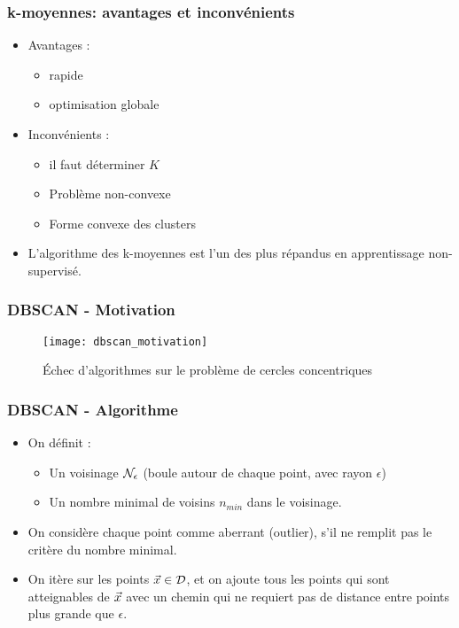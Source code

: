 \begin{frame}
\frametitle{k-moyennes: avantages et inconvénients}
  \begin{itemize}
  	\item Avantages : 
  	\begin{itemize}
  		\item rapide
  		\item optimisation globale
  	\end{itemize}
  	\item Inconvénients : 
  	\begin{itemize}
  		\item il faut déterminer $K$
  		\item Problème non-convexe
  		\item Forme convexe des clusters
  	\end{itemize}
  	\item L'algorithme des k-moyennes est l'un des plus répandus en apprentissage non-supervisé. 
  \end{itemize}
\end{frame}

\begin{frame}
\frametitle{DBSCAN - Motivation}
\begin{figure}[htb]
  \centering
  \texttt{[image: dbscan\_motivation]}
  \caption{Échec d'algorithmes sur le problème de cercles concentriques}
\end{figure}
\end{frame}



\begin{frame}
\frametitle{DBSCAN - Algorithme}
\begin{itemize}
	\item On définit : 
	\begin{itemize}
		\item Un voisinage $\mathcal{N}_{\epsilon}$ (boule autour de chaque point, avec rayon $\epsilon$)
		\item Un nombre minimal de voisins $n_{min}$ dans le voisinage. 
	\end{itemize}
	\item On considère chaque point comme aberrant (outlier), s'il ne remplit pas le critère du nombre minimal. 
	\item On itère sur les points $\vec{x} \in \mathcal{D}$, et on ajoute tous les points qui sont atteignables de $\vec{x}$ avec un chemin qui ne requiert pas de distance entre points plus grande que $\epsilon$. 
\end{itemize}
\end{frame}

